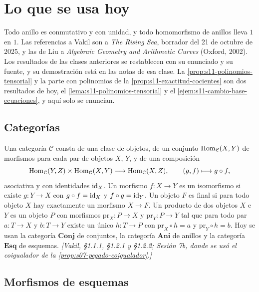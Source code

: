 \section{Lo que se usa hoy}
\label{sec:s11-antecedentes}

Todo anillo es conmutativo y con unidad, y todo homomorfismo de anillos lleva \(1\) en \(1\). Las referencias a Vakil son a \emph{The Rising Sea}, borrador del 21 de octubre de 2025, y las de Liu a \emph{Algebraic Geometry and Arithmetic Curves} (Oxford, 2002). Los resultados de las clases anteriores se restablecen con su enunciado y su fuente, y su demostración está en las notas de esa clase. La \cref{prop:s11-polinomios-tensorial} y la parte con polinomios de la \cref{prop:s11-exactitud-cocientes} son dos resultados de hoy, el \cref{lema:s11-polinomios-tensorial} y el \cref{ejem:s11-cambio-base-ecuaciones}, y aquí solo se enuncian.

\subsection{Categorías}

\begin{defi}
\label{defi:s11-categoria}
Una categoría \(\mathcal C\) consta de una clase de objetos, de un conjunto \(\operatorname{Hom}_{\mathcal C}(X,Y)\) de morfismos para cada par de objetos \(X\), \(Y\), y de una composición
\[
 \operatorname{Hom}_{\mathcal C}(Y,Z)\times\operatorname{Hom}_{\mathcal C}(X,Y)\longrightarrow\operatorname{Hom}_{\mathcal C}(X,Z),
 \qquad (g,f)\longmapsto g\circ f,
\]
asociativa y con identidades \(\operatorname{id}_X\). Un morfismo \(f\colon X\to Y\) es un isomorfismo si existe \(g\colon Y\to X\) con \(g\circ f=\operatorname{id}_X\) y \(f\circ g=\operatorname{id}_Y\). Un objeto \(F\) es final si para todo objeto \(X\) hay exactamente un morfismo \(X\to F\). Un producto de dos objetos \(X\) e \(Y\) es un objeto \(P\) con morfismos \(\mathrm{pr}_X\colon P\to X\) y \(\mathrm{pr}_Y\colon P\to Y\) tal que para todo par \(a\colon T\to X\) y \(b\colon T\to Y\) existe un único \(h\colon T\to P\) con \(\mathrm{pr}_X\circ h=a\) y \(\mathrm{pr}_Y\circ h=b\). Hoy se usan la categoría \(\mathbf{Conj}\) de conjuntos, la categoría \(\mathbf{Ani}\) de anillos y la categoría \(\mathbf{Esq}\) de esquemas. \emph{[Vakil, \S1.1.1, \S1.2.1 y \S1.2.2; Sesión 7b, donde se usó el coigualador de la \cref{prop:s07-pegado-coigualador}.]}
\end{defi}

\subsection{Morfismos de esquemas}


